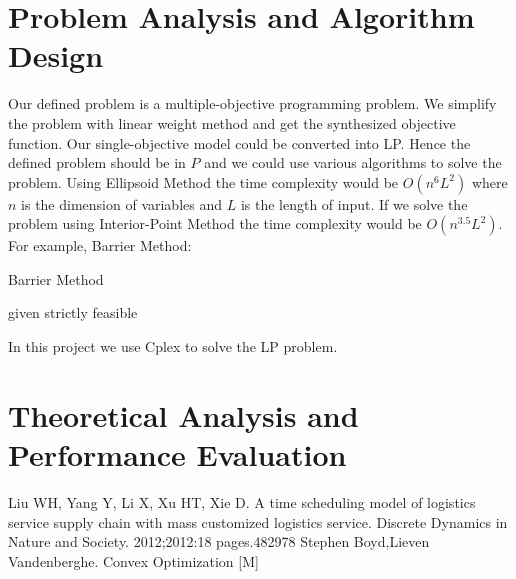 \documentclass[12pt,a4paper]{article}
\begin{document}
\section{Problem Analysis and Algorithm Design}
Our defined problem is a multiple-objective programming problem. We simplify the problem with linear weight method and get the synthesized objective function. Our single-objective model could be converted into LP. Hence the defined problem should be in $P$ and we could use various algorithms to solve the problem. Using Ellipsoid Method the time complexity would be $O(n^6L^2)$ where $n$ is the dimension of variables and $L$ is the length of input. If we solve the problem using Interior-Point Method the time complexity would be $O(n^{3.5}L^2)$.\\
For example, Barrier Method\cite{Convex}:\\
\begin{algorithm}[H]
\caption{Barrier Method}
 given strictly feasible\\
\end{algorithm}
In this project we use Cplex to solve the LP problem.
\section{Theoretical Analysis and Performance Evaluation}


\begin{thebibliography}{1}
  Liu WH, Yang Y, Li X, Xu HT, Xie D. A time scheduling model of logistics service supply chain with mass customized logistics service. Discrete Dynamics in Nature and Society. 2012;2012:18 pages.482978
 Stephen Boyd,Lieven Vandenberghe. Convex Optimization [M]
\end{thebibliography}
\end{document}
